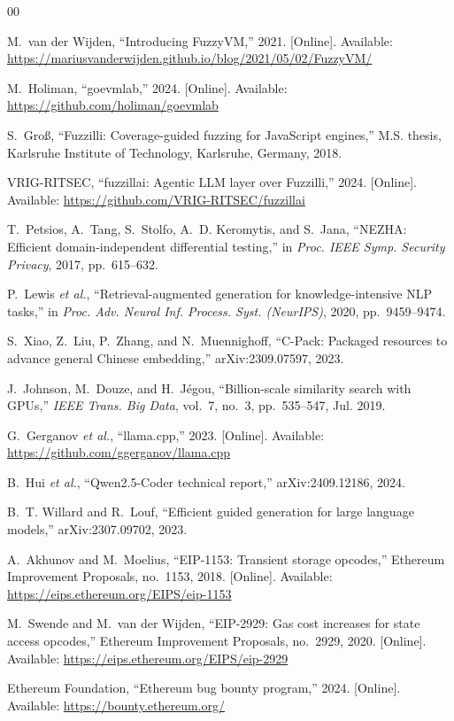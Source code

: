 \documentclass[conference]{IEEEtran}
\begin{document}
\begin{thebibliography}{00}
\itemsep=-1pt

 M.~van der Wijden, ``Introducing FuzzyVM,'' 2021. [Online]. Available: \url{https://mariusvanderwijden.github.io/blog/2021/05/02/FuzzyVM/}

 M.~Holiman, ``goevmlab,'' 2024. [Online]. Available: \url{https://github.com/holiman/goevmlab}

 S.~Gro{\ss}, ``Fuzzilli: Coverage-guided fuzzing for JavaScript engines,'' M.S. thesis, Karlsruhe Institute of Technology, Karlsruhe, Germany, 2018.

 VRIG-RITSEC, ``fuzzillai: Agentic LLM layer over Fuzzilli,'' 2024. [Online]. Available: \url{https://github.com/VRIG-RITSEC/fuzzillai}

 T.~Petsios, A.~Tang, S.~Stolfo, A.~D. Keromytis, and S.~Jana, ``NEZHA: Efficient domain-independent differential testing,'' in \emph{Proc. IEEE Symp. Security Privacy}, 2017, pp.~615--632.

 P.~Lewis \emph{et al.}, ``Retrieval-augmented generation for knowledge-intensive NLP tasks,'' in \emph{Proc. Adv. Neural Inf. Process. Syst. (NeurIPS)}, 2020, pp.~9459--9474.

 S.~Xiao, Z.~Liu, P.~Zhang, and N.~Muennighoff, ``C-Pack: Packaged resources to advance general Chinese embedding,'' arXiv:2309.07597, 2023.

 J.~Johnson, M.~Douze, and H.~J{\'e}gou, ``Billion-scale similarity search with GPUs,'' \emph{IEEE Trans. Big Data}, vol.~7, no.~3, pp.~535--547, Jul. 2019.

 G.~Gerganov \emph{et al.}, ``llama.cpp,'' 2023. [Online]. Available: \url{https://github.com/ggerganov/llama.cpp}

 B.~Hui \emph{et al.}, ``Qwen2.5-Coder technical report,'' arXiv:2409.12186, 2024.

 B.~T. Willard and R.~Louf, ``Efficient guided generation for large language models,'' arXiv:2307.09702, 2023.

 A.~Akhunov and M.~Moelius, ``EIP-1153: Transient storage opcodes,'' Ethereum Improvement Proposals, no.~1153, 2018. [Online]. Available: \url{https://eips.ethereum.org/EIPS/eip-1153}

 M.~Swende and M.~van der Wijden, ``EIP-2929: Gas cost increases for state access opcodes,'' Ethereum Improvement Proposals, no.~2929, 2020. [Online]. Available: \url{https://eips.ethereum.org/EIPS/eip-2929}

 Ethereum Foundation, ``Ethereum bug bounty program,'' 2024. [Online]. Available: \url{https://bounty.ethereum.org/}

\end{thebibliography}
\end{document}
